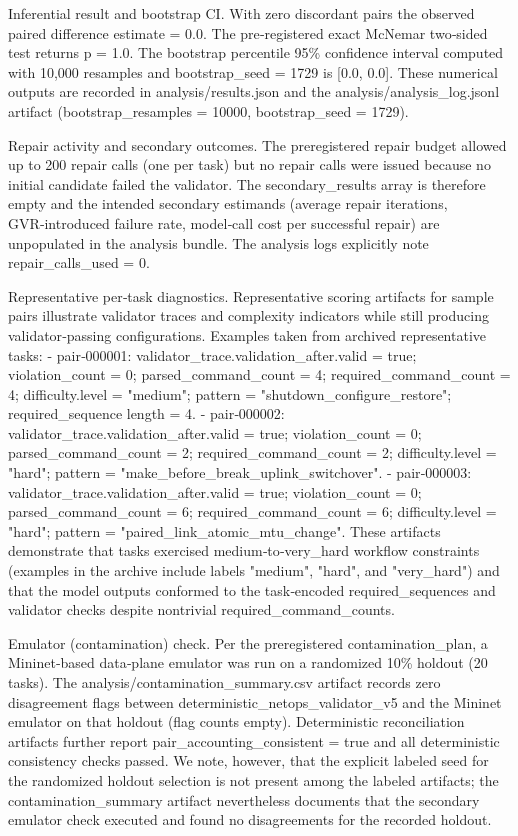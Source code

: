\documentclass[conference]{IEEEtran}
\begin{document}
Inferential result and bootstrap CI. With zero discordant pairs the observed paired difference estimate = 0.0. The pre‑registered exact McNemar two‑sided test returns p = 1.0. The bootstrap percentile 95\% confidence interval computed with 10,000 resamples and bootstrap\_seed = 1729 is [0.0, 0.0]. These numerical outputs are recorded in analysis/results.json and the analysis/analysis\_log.jsonl artifact (bootstrap\_resamples = 10000, bootstrap\_seed = 1729).

Repair activity and secondary outcomes. The preregistered repair budget allowed up to 200 repair calls (one per task) but no repair calls were issued because no initial candidate failed the validator. The secondary\_results array is therefore empty and the intended secondary estimands (average repair iterations, GVR‑introduced failure rate, model‑call cost per successful repair) are unpopulated in the analysis bundle. The analysis logs explicitly note repair\_calls\_used = 0.

Representative per‑task diagnostics. Representative scoring artifacts for sample pairs illustrate validator traces and complexity indicators while still producing validator‑passing configurations. Examples taken from archived representative tasks:
- pair‑000001: validator\_trace.validation\_after.valid = true; violation\_count = 0; parsed\_command\_count = 4; required\_command\_count = 4; difficulty.level = "medium"; pattern = "shutdown\_configure\_restore"; required\_sequence length = 4.
- pair‑000002: validator\_trace.validation\_after.valid = true; violation\_count = 0; parsed\_command\_count = 2; required\_command\_count = 2; difficulty.level = "hard"; pattern = "make\_before\_break\_uplink\_switchover".
- pair‑000003: validator\_trace.validation\_after.valid = true; violation\_count = 0; parsed\_command\_count = 6; required\_command\_count = 6; difficulty.level = "hard"; pattern = "paired\_link\_atomic\_mtu\_change".
These artifacts demonstrate that tasks exercised medium‑to‑very\_hard workflow constraints (examples in the archive include labels "medium", "hard", and "very\_hard") and that the model outputs conformed to the task‑encoded required\_sequences and validator checks despite nontrivial required\_command\_counts.

Emulator (contamination) check. Per the preregistered contamination\_plan, a Mininet‑based data‑plane emulator was run on a randomized 10\% holdout (20 tasks). The analysis/contamination\_summary.csv artifact records zero disagreement flags between deterministic\_netops\_validator\_v5 and the Mininet emulator on that holdout (flag counts empty). Deterministic reconciliation artifacts further report pair\_accounting\_consistent = true and all deterministic consistency checks passed. We note, however, that the explicit labeled seed for the randomized holdout selection is not present among the labeled artifacts; the contamination\_summary artifact nevertheless documents that the secondary emulator check executed and found no disagreements for the recorded holdout.
\end{document}
